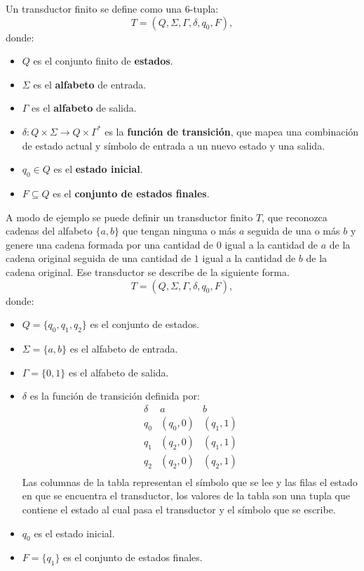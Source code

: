 Un transductor finito se define como una 6-tupla:
\[
  T = (Q, \Sigma, \Gamma, \delta, q_0, F),
\]
donde:
\begin{itemize}
  \item \(Q\) es el conjunto finito de \textbf{estados}.
  \item \(\Sigma\) es el \textbf{alfabeto} de entrada.
  \item \(\Gamma\) es el \textbf{alfabeto} de salida.
  \item \(\delta: Q \times \Sigma \to Q \times \Gamma^*\) es la \textbf{función de transición}, que mapea una combinación de estado actual y símbolo de entrada a un nuevo estado y una salida.
  \item \(q_0 \in Q\) es el \textbf{estado inicial}.
  \item \(F \subseteq Q\) es el \textbf{conjunto de estados finales}.
\end{itemize}

A modo de ejemplo se puede definir un transductor finito $T$, que reconozca cadenas del alfabeto $\{a,b\}$
que tengan ninguna o más $a$ seguida de una o más $b$ y genere una cadena formada por una cantidad de $0$ igual
a la cantidad de $a$ de la cadena original seguida de una cantidad de $1$ igual a la cantidad de $b$ de
la cadena original. Ese transductor se describe de la siguiente forma.
\[
  T = (Q, \Sigma, \Gamma, \delta, q_0, F),
\]
donde:
\begin{itemize}
  \item \(Q = \{q_0, q_1, q_2\}\) es el conjunto de estados.
  \item \(\Sigma = \{a, b\}\) es el alfabeto de entrada.
  \item \(\Gamma = \{0, 1\}\) es el alfabeto de salida.
  \item \(\delta\) es la función de transición definida por:
        \[
          \begin{array}{c|c|c}
            \delta & a        & b        \\
            \hline
            q_0    & (q_0, 0) & (q_1, 1) \\
            q_1    & (q_2, 0) & (q_1, 1) \\
            q_2    & (q_2, 0) & (q_2, 1) \\
          \end{array}
        \]
        Las columnas de la tabla representan el símbolo que se lee y las filas el estado en que se encuentra el transductor, 
        los valores de la tabla son una tupla que contiene el estado al cual pasa el transductor y el símbolo que se escribe.
  \item \(q_0\) es el estado inicial.
  \item \(F = \{q_1\}\) es el conjunto de estados finales.
\end{itemize}

